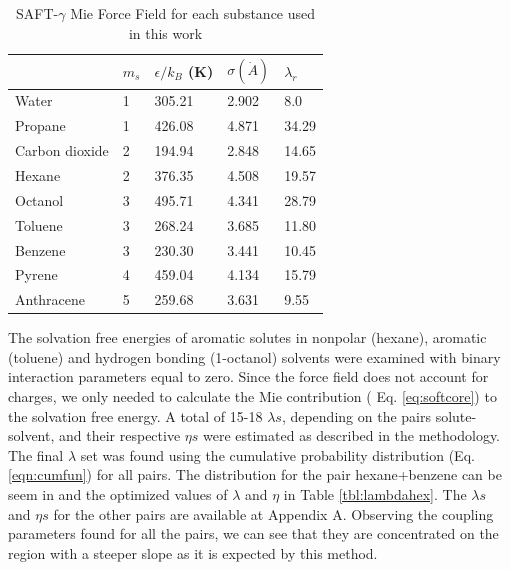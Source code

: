 \begin{table}[h]
\centering
  \caption{SAFT-$\gamma$ Mie Force Field for each substance used in this work}
  \label{tbl:parameters}
  \begin{tabular}{lllll}
      \hline
      \hline
                     & $m_s$ & $\epsilon/k_{B}$ (K) & $\sigma (\dot{A})$ & $\lambda_r$ \\ \hline
      Water          & 1     & 305.21               & 2.902              & 8.0         \\
      Propane        & 1     & 426.08               & 4.871              & 34.29       \\
      Carbon dioxide & 2     & 194.94               & 2.848              & 14.65       \\
      Hexane         & 2     & 376.35               & 4.508              & 19.57       \\
      Octanol        & 3     & 495.71               & 4.341              & 28.79       \\
      Toluene        & 3     & 268.24               & 3.685              & 11.80       \\
      Benzene        & 3     & 230.30               & 3.441              & 10.45       \\
      Pyrene         & 4     & 459.04               & 4.134              & 15.79       \\
      Anthracene     & 5     & 259.68               & 3.631              & 9.55        \\ 
      \hline
      \hline
  \end{tabular}

\end{table}
\FloatBarrier
The solvation free energies of aromatic solutes in nonpolar (hexane), aromatic (toluene) and hydrogen bonding (1-octanol) solvents were examined with binary interaction parameters equal to zero. Since the force field does not account for charges, we only needed to calculate the Mie contribution ( Eq. \eqref{eq:softcore}) to the solvation free energy. A total of 15-18 $\lambda s$, depending on the pairs solute-solvent,   and their respective $\eta s$ were estimated as described in the methodology. The final $\lambda$ set was found using  the cumulative probability distribution (Eq. \eqref{eqn:cumfun}) for all pairs. The distribution for the pair hexane+benzene can be seem in  and the optimized values of $\lambda$ and $\eta$ in Table \ref{tbl:lambdahex}. The $\lambda s$ and $\eta s$  for the other pairs are available at  Appendix A. Observing the coupling parameters found for all the pairs, we can see that they are concentrated on the region with a steeper slope as it is expected by this method.


